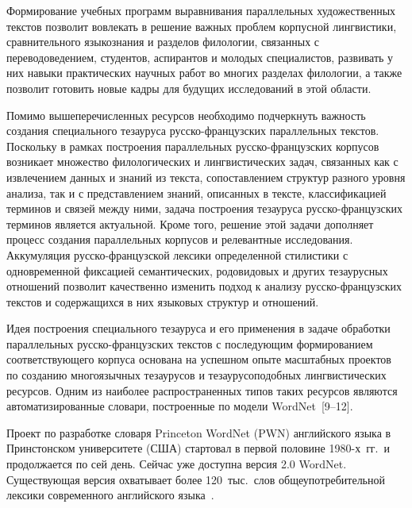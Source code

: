 \begin{multicols}{2}
     Формирование учебных программ выравнивания параллельных 
художественных текстов позволит вовлекать в решение важных проблем 
корпусной лингвистики, сравнительного языкознания и разделов филологии, 
связанных с переводоведением, студентов, аспирантов и молодых 
специалистов, развивать у них навыки практических научных работ во 
многих разделах филологии, а также позволит готовить новые кадры для 
будущих исследований в этой области.
     
     Помимо вышеперечисленных ресурсов необходимо подчеркнуть 
важность создания специального тезауруса рус\-ско-фран\-цуз\-ских 
параллельных текстов. Поскольку в рамках построения параллельных 
     рус\-ско-фран\-цуз\-ских корпусов возникает множество 
филологических и лингвистических задач, связанных как с извлечением 
данных и знаний из текста, сопоставлением структур разного уровня анализа, 
так и с представлением знаний, описанных в тексте, классификацией 
терминов и связей между ними, задача построения тезауруса 
     рус\-ско-фран\-цуз\-ских терминов является актуальной. Кроме того, 
решение этой задачи дополняет процесс создания параллельных корпусов и 
релевантные исследования. Аккумуляция рус\-ско-фран\-цуз\-ской лексики 
определенной стилистики с одновременной фиксацией семантических, 
родовидовых и других тезаурусных отношений позволит качественно 
изменить подход к анализу рус\-ско-фран\-цуз\-ских текстов и содержащихся 
в них языковых структур и отношений.
     
     Идея построения специального тезауруса и его применения в задаче 
обработки параллельных рус\-ско-фран\-цуз\-ских текстов с последующим 
формированием соответствующего корпуса основана на успешном опыте 
масштабных проектов по созданию многоязычных тезаурусов и 
тезаурусоподобных лингвистических ресурсов. Одним из наиболее 
распространенных типов таких ресурсов являются автоматизированные 
словари, построенные по модели WordNet~[9--12].
     
     Проект по разработке словаря Princeton WordNet (PWN) английского 
языка в Принстонском университете (США) стартовал в первой половине 
1980-х~гг.\ и продолжается по сей день. Сейчас уже доступна версия 
2.0 WordNet. Существующая версия охватывает более 120~тыс.\ слов 
общеупотребительной лексики современного английского 
     языка~\cite{12-ko}.
     
     \begin{figure*} %
\vspace*{1pt}
 \begin{center}
 \mbox{%
 \epsfxsize=162.463mm
 }
 \end{center}
 \vspace*{-3pt}
\end{figure*}
     

\end{multicols}
